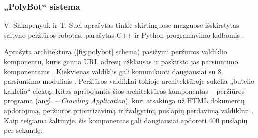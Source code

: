 \subsubsection{„PolyBot“ sistema}

V. Shkapenyuk ir T. Suel aprašytas tinkle skirtinguose mazguose išskirstytas saityno peržiūros robotas, parašytas C++ ir Python programavimo kalbomis \cite{PolyBotArchitecture}.

Aprašyta architektūra (\ref{fig:polybot} schema) pasižymi peržiūros valdiklio komponentu, kuris gauna URL adresų užklausas ir paskirsto jas parsiuntimo komponentams \cite{PolyBotArchitecture}. Kiekvienas valdiklis gali komunikuoti daugiausiai su 8 parsiuntimo moduliais \cite{PolyBotArchitecture}. Peržiūros valdikliai tokioje architektūroje sukelia „butelio kaklelio“ efektą. Kitas apribojantis šios architektūros komponentas -- peržiūros programa (angl. -- \textit{Crawling Application}), kuri atsakinga už HTML dokumentų apdorojimą, peržiūros prioritizavimą ir žvalgytinų puslapių perdavimą valdikliui \cite{PolyBotArchitecture}. Kaip teigiama \cite{PolyBotArchitecture} šaltinyje, šis komponentas gali daugiausiai apdoroti 400 puslapių per sekundę.


